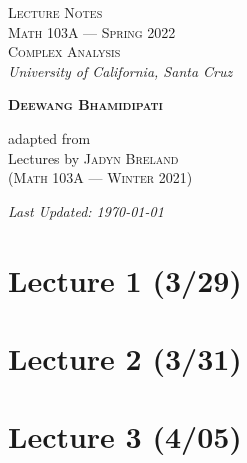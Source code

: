 
 

 
 
\begin{titlepage}
    \centering
    \vspace*{\fill}

	\vspace{-2in}

    {\Huge
    \textsc{Lecture Notes}}\\
    \vspace{0.1in}
	{\Large
	\textsc{Math 103A --- Spring 2022\\[0.5em] Complex Analysis}}\\
	\vspace{0.5in}    
    {\Large
    \textsl{University of California, Santa Cruz}}
	
    \vspace*{0.5in}

	{\LARGE    
    \textbf{\textsc{Deewang Bhamidipati}}}
	
    \vspace*{0.5in}

	{{\large adapted from}\\
	\Large    
    Lectures by
	\textsc{Jadyn Breland}\\[0.2em]
	{\normalsize(\textsc{Math 103A --- Winter 2021)}}}

	\vspace*{\fill}
	{\normalsize    
    \textsl{Last Updated: \today}}
    \end{titlepage}
    
\tableofcontents
\pagebreak

\section{Lecture 1 (3/29)}

\newpage

\section{Lecture 2 (3/31)}

\newpage

\section{Lecture 3 (4/05)}

\newpage

